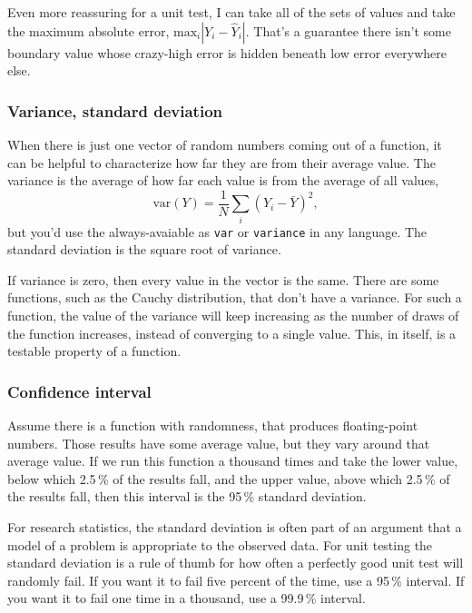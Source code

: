 \documentclass[fleqn,10pt]{olplainarticle}
\begin{document}
Even more reassuring for a unit test, I can take all of the
sets of values and take the maximum absolute error,
$\mbox{max}_i |Y_i-\hat{Y}_i|$. That's a guarantee there isn't
some boundary value whose crazy-high error is hidden beneath
low error everywhere else.

\subsubsection{Variance, standard deviation}
When there is just one vector of random numbers coming out
of a function, it can be helpful to characterize how far
they are from their average value. The variance is
the average of how far each value is from the average of all
values,
\begin{equation}
  \mbox{var}(Y) = \frac{1}{N}\sum_i (Y_i - \bar{Y})^2,
\end{equation}
but you'd use the always-avaiable
as \lstinline!var! or \lstinline!variance! in any language.
The standard deviation is the square root of variance.

If variance is zero, then every value in the vector is
the same. There are some functions, such as the Cauchy
distribution, that don't have a variance. For such a function,
the value of the variance will keep increasing as the
number of draws of the function increases, instead of
converging to a single value. This, in itself, is a
testable property of a function.


\subsubsection{Confidence interval}

Assume there is a function with randomness, that produces floating-point numbers. Those results
have some average value, but they vary around that average value.
If we run this function a thousand times and take the
lower value, below which 2.5\,\% of the results fall,
and the upper value, above which 2.5\,\% of the results fall,
then this interval is the 95\,\% standard deviation.

For research statistics, the standard deviation is often part
of an argument that a model of a problem is appropriate to
the observed data. For unit testing the standard deviation
is a rule of thumb for how often a perfectly good unit test
will randomly fail. If you want it to fail five percent of
the time, use a 95\,\% interval. If you want it to fail
one time in a thousand, use a 99.9\,\% interval.
\end{document}

